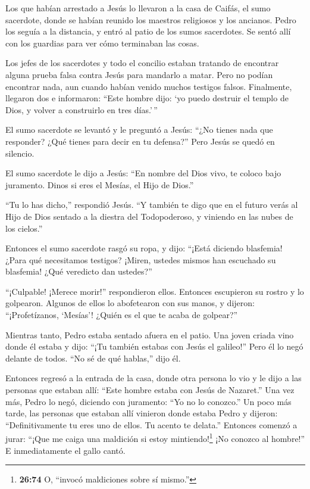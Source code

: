  Los que habían arrestado a Jesús lo llevaron a la casa de
Caifás, el sumo sacerdote, donde se habían reunido los maestros
religiosos y los ancianos.  Pedro los seguía a la
distancia, y entró al patio de los sumos sacerdotes. Se sentó allí con
los guardias para ver cómo terminaban las cosas.

 Los jefes de los sacerdotes y todo el concilio estaban
tratando de encontrar alguna prueba falsa contra Jesús para mandarlo a
matar.  Pero no podían encontrar nada, aun cuando habían
venido muchos testigos falsos. Finalmente, llegaron dos  e
informaron: ``Este hombre dijo: `yo puedo destruir el templo de Dios, y
volver a construirlo en tres días.'\,''

 El sumo sacerdote se levantó y le preguntó a Jesús: ``¿No
tienes nada que responder? ¿Qué tienes para decir en tu defensa?''
 Pero Jesús se quedó en silencio.

El sumo sacerdote le dijo a Jesús: ``En nombre del Dios vivo, te coloco
bajo juramento. Dinos si eres el Mesías, el Hijo de Dios.''

 ``Tu lo has dicho,'' respondió Jesús. ``Y también te digo
que en el futuro verás al Hijo de Dios sentado a la diestra del
Todopoderoso, y viniendo en las nubes de los cielos.''

 Entonces el sumo sacerdote rasgó su ropa, y dijo: ``¡Está
diciendo blasfemia! ¿Para qué necesitamos testigos? ¡Miren, ustedes
mismos han escuchado su blasfemia!  ¿Qué veredicto dan
ustedes?''

``¡Culpable! ¡Merece morir!'' respondieron ellos.  Entonces
escupieron su rostro y lo golpearon. Algunos de ellos lo abofetearon con
sus manos,  y dijeron: ``¡Profetízanos, `Mesías'! ¿Quién es
el que te acaba de golpear?''

 Mientras tanto, Pedro estaba sentado afuera en el patio.
Una joven criada vino donde él estaba y dijo: ``¡Tu también estabas con
Jesús el galileo!''  Pero él lo negó delante de todos. ``No
sé de qué hablas,'' dijo él.

 Entonces regresó a la entrada de la casa, donde otra
persona lo vio y le dijo a las personas que estaban allí: ``Este hombre
estaba con Jesús de Nazaret.''  Una vez más, Pedro lo negó,
diciendo con juramento: ``Yo no lo conozco.''  Un poco más
tarde, las personas que estaban allí vinieron donde estaba Pedro y
dijeron: ``Definitivamente tu eres uno de ellos. Tu acento te delata.''
 Entonces comenzó a jurar: ``¡Que me caiga una maldición si
estoy mintiendo!\footnote{\textbf{26:74} O, ``invocó maldiciones sobre
  sí mismo.''} ¡No conozco al hombre!'' E inmediatamente el gallo cantó.


